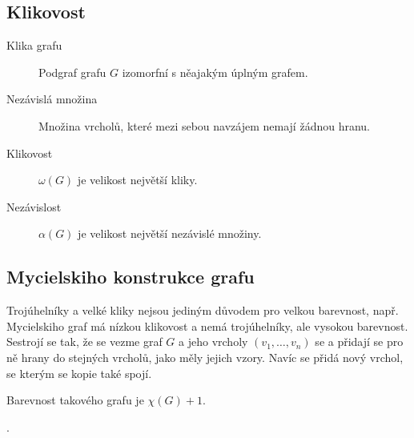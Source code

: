 \label{lemma:veta-o-ctyrech-barvach}

\label{lemma:veta-o-peti-barvach}

\subsection{Klikovost}

\begin{description}
    \item[Klika grafu] Podgraf grafu $G$ izomorfní s něajakým úplným grafem.
    \item[Nezávislá množina] Množina vrcholů, které mezi sebou navzájem nemají žádnou hranu.
    \item[Klikovost] $\omega(G)$ je velikost největší kliky.
    \item[Nezávislost] $\alpha(G)$ je velikost největší nezávislé množiny.
\end{description}


\subsection{Mycielskiho konstrukce grafu}\label{alg:mycielskian}

Trojúhelníky a velké kliky nejsou jediným důvodem pro velkou barevnost, např. Mycielskiho graf má nízkou klikovost a nemá trojúhelníky, ale vysokou barevnost.
Sestrojí se tak, že se vezme graf $G$ a jeho vrcholy $(v_1, \dots, v_n)$ se  a přidají se pro ně hrany do stejných vrcholů, jako měly jejich vzory.
Navíc se přidá nový vrchol, se kterým se kopie také spojí.

Barevnost takového grafu je $\chi(G) + 1$. 

.\label{lemma:graf-s-barevnosti-k}
